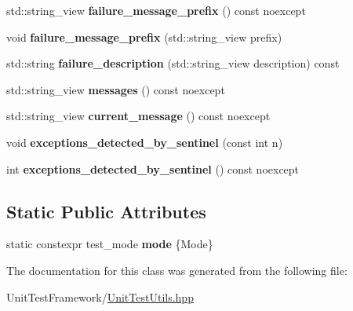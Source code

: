 \begin{DoxyCompactItemize}
\item 
\mbox{\label{classsequoia_1_1unit__testing_1_1unit__test__logger_a24250389b0e07d2e1184b224287ac0a6}} 
std\+::string\+\_\+view {\bfseries failure\+\_\+message\+\_\+prefix} () const noexcept
\item 
\mbox{\label{classsequoia_1_1unit__testing_1_1unit__test__logger_a88825394c4189c8bd27bb93a84e1e17e}} 
void {\bfseries failure\+\_\+message\+\_\+prefix} (std\+::string\+\_\+view prefix)
\item 
\mbox{\label{classsequoia_1_1unit__testing_1_1unit__test__logger_a3bddd319c28ad8d02d4410127d8334b1}} 
std\+::string {\bfseries failure\+\_\+description} (std\+::string\+\_\+view description) const
\item 
\mbox{\label{classsequoia_1_1unit__testing_1_1unit__test__logger_ac5a715ed08abaeb86c7d0ad46679b06b}} 
std\+::string\+\_\+view {\bfseries messages} () const noexcept
\item 
\mbox{\label{classsequoia_1_1unit__testing_1_1unit__test__logger_a2364591a4223c5f60e008853b6dcae16}} 
std\+::string\+\_\+view {\bfseries current\+\_\+message} () const noexcept
\item 
\mbox{\label{classsequoia_1_1unit__testing_1_1unit__test__logger_a06f7e17739eaa77469bccbb7796b4bab}} 
void {\bfseries exceptions\+\_\+detected\+\_\+by\+\_\+sentinel} (const int n)
\item 
\mbox{\label{classsequoia_1_1unit__testing_1_1unit__test__logger_a4929abfe8939850feb28bcf14cb6188c}} 
int {\bfseries exceptions\+\_\+detected\+\_\+by\+\_\+sentinel} () const noexcept
\end{DoxyCompactItemize}
\subsection*{Static Public Attributes}
\begin{DoxyCompactItemize}
\item 
\mbox{\label{classsequoia_1_1unit__testing_1_1unit__test__logger_a63e29ca4401155296c76418656b4ac65}} 
static constexpr test\+\_\+mode {\bfseries mode} \{Mode\}
\end{DoxyCompactItemize}


The documentation for this class was generated from the following file\+:\begin{DoxyCompactItemize}
\item 
Unit\+Test\+Framework/\mbox{\hyperlink{_unit_test_utils_8hpp}{Unit\+Test\+Utils.\+hpp}}\end{DoxyCompactItemize}

